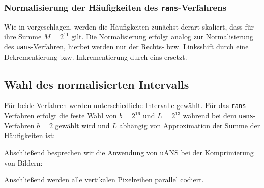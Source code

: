\documentclass[a4paper,12pt]{article}
\begin{document}
 
\subsubsection{Normalisierung der Häufigkeiten des {\tt{rans}}-Verfahrens}
Wie in \cite{Krajcevski} vorgeschlagen, werden die Häufigkeiten zunächst derart skaliert, dass für ihre Summe $M= 2^{11}$ gilt. 
Die Normalisierung erfolgt analog zur Normalisierung des {\tt{uans}}-Verfahren, hierbei werden nur der Rechts- bzw. Linksshift durch eine Dekrementierung bzw. Inkrementierung durch eins ersetzt.


\subsection{Wahl des normalisierten Intervalls}
Für beide Verfahren werden unterschiedliche Intervalle gewählt. Für das {\tt{rans}}-Verfahren erfolgt die feste Wahl von $b= 2^{16}$ und $L=2^{13}$ während bei dem {\tt{uans}}-Verfahren $b=2$ gewählt wird und $L$ abhängig von Approximation der Summe der Häufigkeiten ist:
\begin{minipage}[h]{.7\textwidth}
Abschließend besprechen wir die Anwendung von uANS bei der Komprimierung von Bildern:

Anschließend werden alle vertikalen Pixelreihen parallel codiert.
\end{minipage}
\hfill
\end{document}
